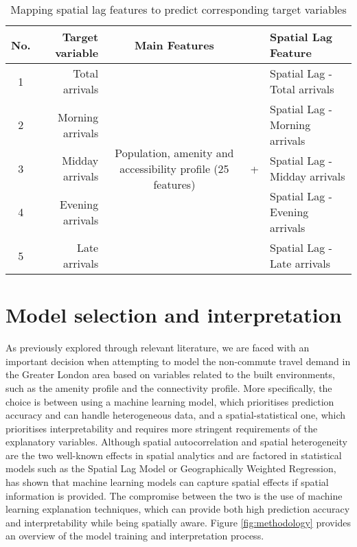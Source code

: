 \begin{table}[ht]
    \centering
    \renewcommand{\arraystretch}{1.5}
    \begin{tabular}{|c r || c c l|}
        \hline
        \rowcolor{lightgray}
        \textbf{No.} & \textbf{Target variable} & \textbf{Main Features} & &\textbf{Spatial Lag Feature}\\
        
        \hline
        1 & Total arrivals  &  \multirow{5}{10em}{Population, amenity and accessibility profile (25 features)} 
                                &  \multirow{5}{*}{+}       &   Spatial Lag - Total arrivals    \\ 
        2 & Morning arrivals    &                       &   &   Spatial Lag - Morning arrivals  \\ 
        3 & Midday arrivals     &                       &   &   Spatial Lag - Midday arrivals   \\ 
        4 & Evening arrivals    &                       &   &   Spatial Lag - Evening arrivals  \\ 
        5 & Late arrivals       &                       &   &   Spatial Lag - Late arrivals     \\
        \hline
    \end{tabular}
    \caption{Mapping spatial lag features to predict corresponding target variables}
    \label{tab:spatiallag}
\end{table}



\pagebreak[4] %
\section{Model selection and interpretation}

As previously explored through relevant literature, we are faced with an important decision when attempting to model the non-commute travel demand in the Greater London area based on variables related to the built environments, such as the amenity profile and the connectivity profile. More specifically, the choice is between using a machine learning model, which prioritises prediction accuracy and can handle heterogeneous data, and a spatial-statistical one, which prioritises interpretability and requires more stringent requirements of the explanatory variables. Although spatial autocorrelation and spatial heterogeneity are the two well-known effects in spatial analytics and are factored in statistical models such as the Spatial Lag Model or Geographically Weighted Regression, \citet{liExtractingSpatialEffects2022} has shown that machine learning models can capture spatial effects if spatial information is provided. The compromise between the two is the use of machine learning explanation techniques, which can provide both high prediction accuracy and interpretability while being spatially aware. Figure \ref{fig:methodology} provides an overview of the model training and interpretation process.

